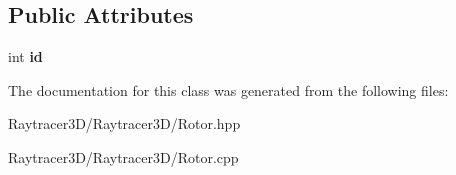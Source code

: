 \subsection*{Public Attributes}
\begin{DoxyCompactItemize}
\item 
\hypertarget{class_rotor_abcb7f6ed3121a0734eef3763d4d20172}{}\label{class_rotor_abcb7f6ed3121a0734eef3763d4d20172} 
int {\bfseries id}
\end{DoxyCompactItemize}


The documentation for this class was generated from the following files\+:\begin{DoxyCompactItemize}
\item 
Raytracer3\+D/\+Raytracer3\+D/Rotor.\+hpp\item 
Raytracer3\+D/\+Raytracer3\+D/Rotor.\+cpp\end{DoxyCompactItemize}
